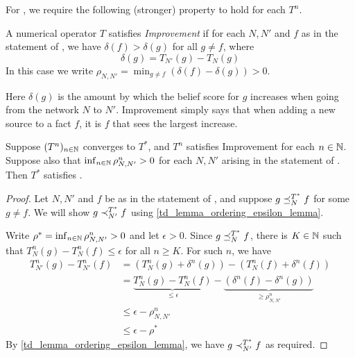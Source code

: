 For \monotonicity{}, we require the following (stronger) property to hold for each
$T^n$.

\begin{definition}

    A numerical operator $T$ satisfies \emph{Improvement} if for each $N, N'$
    and $f$ as in the statement of \monotonicity{}, we have $\delta(f) >
    \delta(g)$ for all $g \ne f$, where
    \[
        \delta(g) = T_{N'}(g) - T_N(g)
    \]
    In this case we write $\rho_{N,N'} = \min_{g \ne f}{(\delta(f) -
    \delta(g))} > 0$.

\end{definition}

Here $\delta(g)$ is the amount by which the belief score for $g$ increases when
going from the network $N$ to $N'$. Improvement simply says that when adding a
new source to a fact $f$, it is $f$ that sees the largest increase.

\begin{proposition}

    Suppose $(T^n)_{n \in \mathbb{N}}$ converges to $T^*$, and $T^n$ satisfies
    Improvement for each $n \in \mathbb{N}$. Suppose also that $\inf_{n \in
    \mathbb{N}}{\rho_{N,N'}^n} > 0$ for each $N, N'$ arising in the statement of
    \monotonicity{}. Then $T^*$ satisfies \monotonicity{}.

\end{proposition}

\begin{proof}

    Let $N, N'$ and $f$ be as in the statement of \monotonicity{}, and suppose $g
    \preceq_N^{T^*} f$ for some $g \ne f$. We will show $g \prec_{N'}^{T^*} f$
    using \cref{td_lemma_ordering_epsilon_lemma}.

    Write $\rho^* = \inf_{n \in \mathbb{N}}{\rho_{N,N'}^n} > 0$ and let $\epsilon >
    0$. Since $g \preceq_N^{T^*} f$, there is $K \in \mathbb{N}$ such that $T^n_N(g) -
    T^n_N(f) \le \epsilon$ for all $n \ge K$. For such $n$, we have
    \begin{align*}
        T_{N'}^n(g) - T_{N'}^n(f)
        &= (T_N^n(g) + \delta^n(g)) - (T_N^n(f) + \delta^n(f)) \\
        &=
            \underbrace{T_N^n(g) - T_N^n(f)}_{\le \epsilon}
            -
            \underbrace{(\delta^n(f) - \delta^n(g))}_{\ge \rho_{N,N'}^n}
            \\
        &\le \epsilon - \rho_{N,N'}^n \\
        &\le \epsilon - \rho^*
    \end{align*}
    By \cref{td_lemma_ordering_epsilon_lemma}, we have $g \prec_{N'}^{T^*} f$
    as required.
\end{proof}

